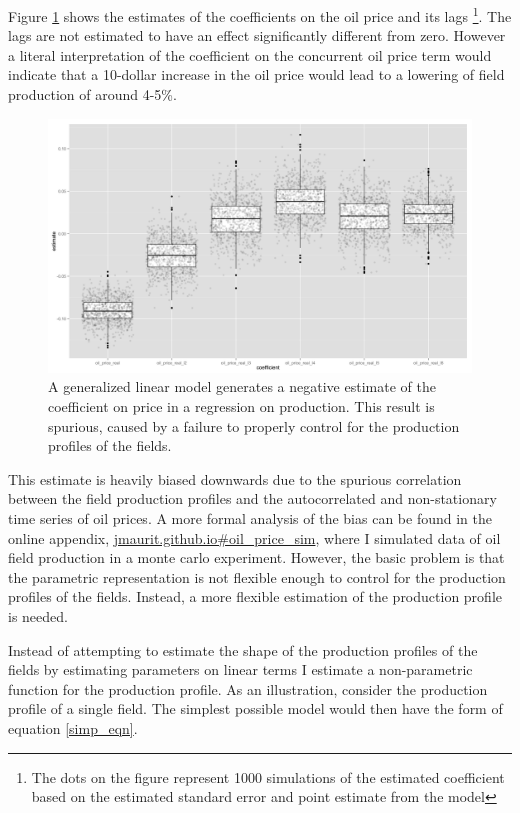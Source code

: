 \documentclass[12pt]{article}
\begin{document}
Figure \ref{glm_dirty_box} shows the estimates of the coefficients on the oil price and its lags \footnote{The dots on the figure represent 1000 simulations of the estimated coefficient based on the estimated standard error and point estimate from the model}.  The lags are not estimated to have an effect significantly different from zero. However a literal interpretation of the coefficient on the concurrent oil price term would indicate that a 10-dollar increase in the oil price would lead to a lowering of field production of around 4-5\%.

\begin{figure}
\includegraphics[width=1\textwidth]{figures/glm_dirty_box_print.png}
\caption{A generalized linear model generates a negative estimate of the coefficient on price in a regression on production.  This result is spurious, caused by a failure to properly control for the production profiles of the fields.}
\label{glm_dirty_box}
\end{figure}

This estimate is heavily biased downwards due to the spurious correlation between the field production profiles and the autocorrelated and non-stationary time series of oil prices.  A more formal analysis of the bias can be found in the online appendix, \url{jmaurit.github.io#oil_price_sim}, where I simulated data of oil field production in a monte carlo experiment.  However, the basic problem is that the parametric representation is not flexible enough to control for the production profiles of the fields.   Instead, a more flexible estimation of the production profile is needed. 

Instead of attempting to estimate the shape of the production profiles of the fields by estimating parameters on linear terms I estimate a non-parametric function for the production profile.  As an illustration, consider the production profile of a single field.  The simplest possible model would then have the form of equation \ref{simp_eqn}. 
\end{document}
